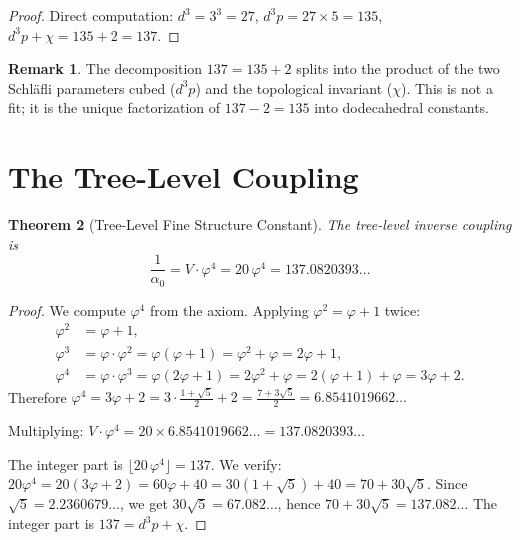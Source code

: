 \documentclass[11pt,a4paper]{article}
\theoremstyle{plain}
\newtheorem{theorem}{Theorem}[section]
\theoremstyle{definition}
\newtheorem{remark}[theorem]{Remark}
\newcommand{\vp}{\varphi}
\begin{document}
\begin{proof}
Direct computation: $d^3 = 3^3 = 27$, $d^3 p = 27 \times 5 = 135$,
$d^3 p + \chi = 135 + 2 = 137$.
\end{proof}

\begin{remark}\label{rem:137}
The decomposition $137 = 135 + 2$ splits into the product of the two
Schl\"afli parameters cubed ($d^3 p$) and the topological invariant
($\chi$).  This is not a fit; it is the unique factorization of $137 - 2 = 135$
into dodecahedral constants.
\end{remark}

\section{The Tree-Level Coupling}\label{sec:tree}

\begin{theorem}[Tree-Level Fine Structure Constant]\label{thm:tree}
The tree-level inverse coupling is
\[
  \frac{1}{\alpha_0} = V \cdot \vp^4 = 20\,\vp^4 = 137.0820393\ldots
\]
\end{theorem}

\begin{proof}
We compute $\vp^4$ from the axiom.  Applying $\vp^2 = \vp + 1$ twice:
\begin{align*}
  \vp^2 &= \vp + 1, \\
  \vp^3 &= \vp \cdot \vp^2 = \vp(\vp + 1) = \vp^2 + \vp = 2\vp + 1, \\
  \vp^4 &= \vp \cdot \vp^3 = \vp(2\vp + 1) = 2\vp^2 + \vp = 2(\vp+1) + \vp = 3\vp + 2.
\end{align*}
Therefore $\vp^4 = 3\vp + 2 = 3 \cdot \frac{1+\sqrt{5}}{2} + 2
= \frac{7 + 3\sqrt{5}}{2} = 6.8541019662\ldots$

Multiplying: $V \cdot \vp^4 = 20 \times 6.8541019662\ldots = 137.0820393\ldots$

The integer part is $\lfloor 20\,\vp^4 \rfloor = 137$.  We verify:
$20\vp^4 = 20(3\vp + 2) = 60\vp + 40 = 30(1+\sqrt{5}) + 40 = 70 + 30\sqrt{5}$.
Since $\sqrt{5} = 2.2360679\ldots$, we get $30\sqrt{5} = 67.082\ldots$,
hence $70 + 30\sqrt{5} = 137.082\ldots$ The integer part is $137 = d^3 p + \chi$.
\end{proof}

\end{document}
